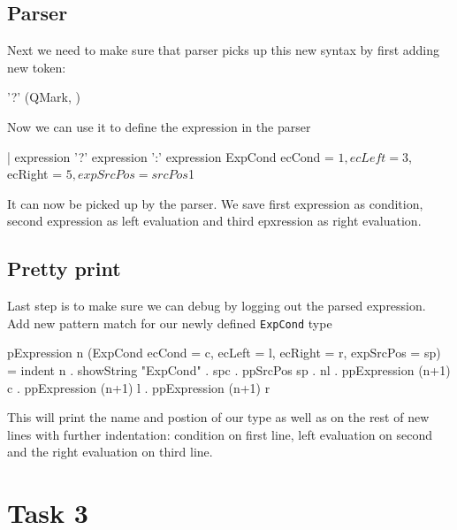 \documentclass{article}
\begin{document}
\subsection{Parser}
\begin{flushleft}
Next we need to make sure that parser picks up this new syntax by first adding new token:
\end{flushleft}
\begin{code}
'?'         { (QMark, $$) }
\end{code}
\begin{flushleft}
Now we can use it to define the expression in the parser
\end{flushleft}
\begin{code}
| expression '?' expression ':' expression
    { ExpCond {ecCond    = $1,
               ecLeft    = $3,
               ecRight   = $5,
               expSrcPos = srcPos $1} }
\end{code}
\begin{flushleft}
It can now be picked up by the parser. We save first expression as condition, second expression as left evaluation and third epxression as right evaluation.
\end{flushleft}

\subsection{Pretty print}
\begin{flushleft}
Last step is to make sure we can debug by logging out the parsed expression. Add new pattern match for our newly defined \texttt{ExpCond} type
\end{flushleft}
\begin{code}
pExpression n (ExpCond {ecCond = c, ecLeft = l, ecRight = r, expSrcPos = sp}) =
    indent n . showString "ExpCond" . spc . ppSrcPos sp . nl
    . ppExpression (n+1) c
    . ppExpression (n+1) l
    . ppExpression (n+1) r
\end{code}
\begin{flushleft}
This will print the name and postion of our type as well as on the rest of new lines with further indentation:
condition on first line, left evaluation on second and the right evaluation on third line.
\end{flushleft}

\section{Task 3}
\end{document}
